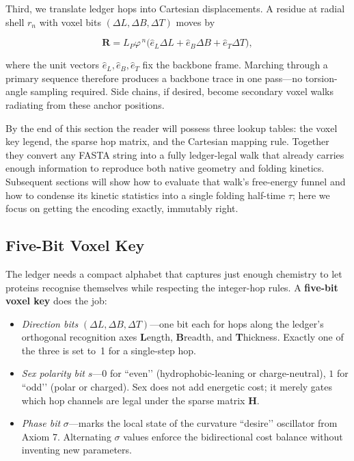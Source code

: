 \documentclass[11pt]{article}
\newcommand{\phiGR}{\varphi}                 %
\newcommand{\LP}{L_{\!P}}                    %
\begin{document}
Third, we translate ledger hops into Cartesian displacements.  A residue
at radial shell \(r_{n}\) with voxel bits \((\Delta L,\Delta B,\Delta T)\)
moves by

\[
  \mathbf R = \LP \phiGR^{\,n}\!
    \bigl(\hat e_{L}\Delta L + \hat e_{B}\Delta B + \hat e_{T}\Delta T\bigr),
\]

\noindent
where the unit vectors \(\hat e_{L},\hat e_{B},\hat e_{T}\) fix the
backbone frame.  Marching through a primary sequence therefore produces
a backbone trace in one pass—no torsion-angle sampling required.  Side
chains, if desired, become secondary voxel walks radiating from these
anchor positions.

By the end of this section the reader will possess three lookup tables:
the voxel key legend, the sparse hop matrix, and the Cartesian mapping
rule.  Together they convert any FASTA string into a fully ledger-legal
walk that already carries enough information to reproduce both native
geometry and folding kinetics.  Subsequent sections will show how to
evaluate that walk’s free-energy funnel and how to condense its kinetic
statistics into a single folding half-time \(\tau\); here we focus on
getting the encoding exactly, immutably right.

\subsection{Five-Bit Voxel Key}\label{sec:voxel-key}

The ledger needs a compact alphabet that captures just enough chemistry
to let proteins recognise themselves while respecting the integer-hop
rules.  A \textbf{five-bit voxel key} does the job:

\begin{itemize}\setlength\itemsep{2pt}
\item \emph{Direction bits} $(\Delta L,\Delta B,\Delta T)$—one bit each
      for hops along the ledger’s orthogonal recognition axes
      \textbf{L}ength, \textbf{B}readth, and \textbf{T}hickness.
      Exactly one of the three is set to~1 for a single-step hop.
\item \emph{Sex polarity bit} $s$—\(0\) for “even’’ (hydrophobic-leaning
      or charge-neutral), \(1\) for “odd’’ (polar or charged).  Sex does
      not add energetic cost; it merely gates which hop channels are
      legal under the sparse matrix \(\mathbf H\).
\item \emph{Phase bit} $\sigma$—marks the local state of the curvature
      “desire’’ oscillator from Axiom 7.  Alternating $\sigma$ values
      enforce the bidirectional cost balance without inventing new
      parameters.
\end{itemize}
\end{document}

